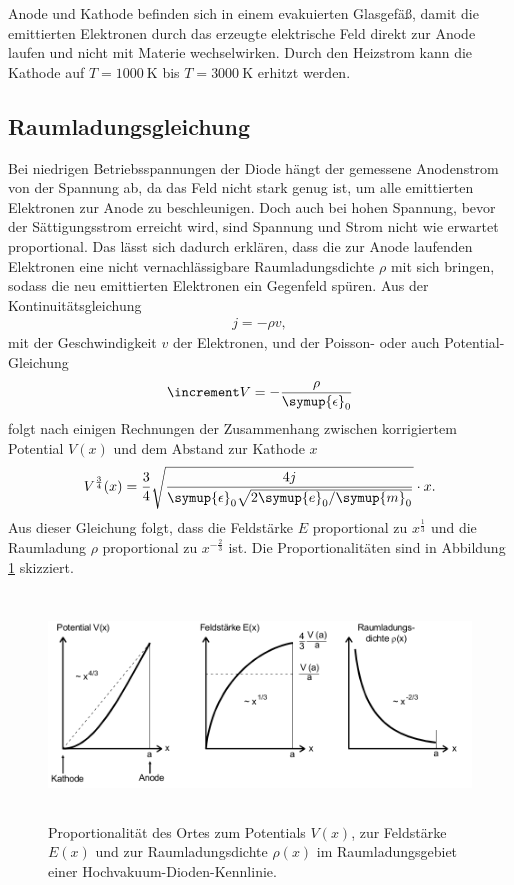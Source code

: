 \FloatBarrier

Anode und Kathode befinden sich in einem evakuierten Glasgefäß, damit
die emittierten Elektronen durch das erzeugte elektrische Feld direkt zur Anode
laufen und nicht mit Materie wechselwirken.
Durch den Heizstrom kann die Kathode auf $T = \SI{1000}{\kelvin}$ bis
$T = \SI{3000}{\kelvin}$ erhitzt werden.

\subsection{Raumladungsgleichung}

Bei niedrigen Betriebsspannungen der Diode hängt der gemessene Anodenstrom
von der Spannung ab, da das Feld nicht stark genug ist, um alle emittierten
Elektronen zur Anode zu beschleunigen.
Doch auch bei hohen Spannung, bevor der Sättigungsstrom erreicht wird,
sind Spannung und Strom nicht wie erwartet proportional.
Das lässt sich dadurch erklären, dass die zur Anode laufenden Elektronen
eine nicht vernachlässigbare Raumladungsdichte $\rho$ mit sich bringen,
sodass die neu emittierten Elektronen ein Gegenfeld spüren.
Aus der Kontinuitätsgleichung
\begin{align}
  j = -\rho v,
\end{align}
mit der Geschwindigkeit $v$ der Elektronen, und der Poisson- oder auch
Potential-Gleichung
\begin{align}
  \increment V = -\frac{\rho}{\symup{\epsilon}_0}
\end{align}
folgt nach einigen Rechnungen der Zusammenhang zwischen korrigiertem
Potential $V(x)$ und dem Abstand zur Kathode $x$
\begin{align}
  V^{\frac{3}{4}}(x) = \frac{3}{4}
  \sqrt{\frac{4 j}{\symup{\epsilon}_0\sqrt{2 \symup{e}_0 / \symup{m}_0}}}\cdot x.
\end{align}
Aus dieser Gleichung folgt, dass die Feldstärke $E$ proportional zu
$x^{\frac{1}{3}}$ und die Raumladung $\rho$ proportional zu $x^{-\frac{2}{3}}$
ist. Die Proportionalitäten sind in Abbildung \ref{fig:Ortsabh} skizziert.

\begin{figure}
  \centering
  \includegraphics[height=6cm]{SommerAlbum15/Ortsabh.png}
  \caption{Proportionalität des Ortes zum Potentials $V(x)$, zur Feldstärke
  $E(x)$ und zur Raumladungsdichte $\rho(x)$ im Raumladungsgebiet einer
  Hochvakuum-Dioden-Kennlinie.\cite{anleitung}}
  \label{fig:Ortsabh}
\end{figure}

